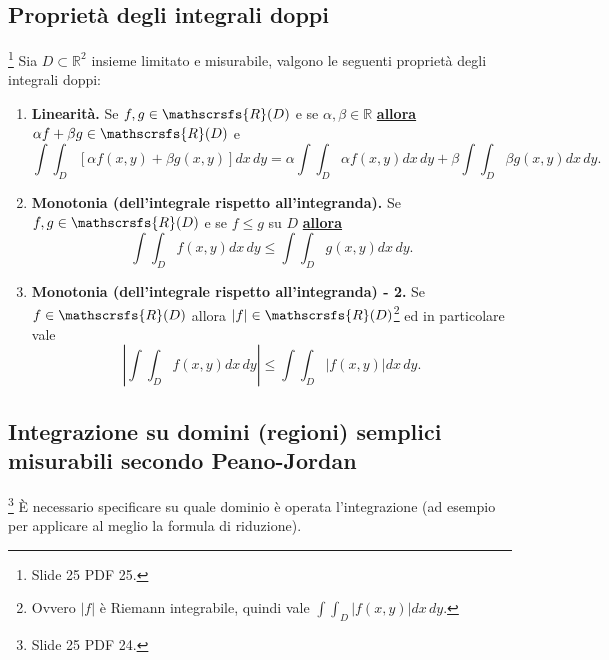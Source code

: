 \subsection{Proprietà degli integrali doppi}
\begin{property}\footnote{Slide 25 PDF 25.}
	 Sia $D\subset\mathbb{R}^2$ insieme limitato e misurabile, valgono le seguenti proprietà degli integrali doppi:
	\begin{enumerate}
		\item \textbf{Linearità.} Se $f,g\in\mathscrsfs{R}(D)$ e se $\alpha,\beta\in \mathbb{R}$ \textbf{\ul{allora}} $\alpha f + \beta g\in \mathscrsfs{R}(D)$ e
		\begin{equation*}
			\int\int_D [\alpha f(x,y) + \beta g(x,y)]dx\, dy = \alpha\int\int_D \alpha f(x,y) dx\, dy + \beta\int\int_D \beta g(x,y)dx\, dy.
		\end{equation*}
		\item \textbf{Monotonia (dell'integrale rispetto all'integranda).} Se $f,g\in\mathscrsfs{R}(D)$ e se $f\leq g$ su $D$ \textbf{\ul{allora}}
		\begin{equation*}
			\int\int_D f(x,y) dx\, dy \leq \int\int_D g(x,y) dx\, dy.
		\end{equation*}
		\item \textbf{Monotonia (dell'integrale rispetto all'integranda) - 2.} Se $f\in \mathscrsfs{R}(D)$ allora $|f|\in\mathscrsfs{R}(D)$\footnote{Ovvero $|f|$ è Riemann integrabile, quindi vale $\int\int_D |f(x,y)| dx\, dy$.} ed in particolare vale
		\begin{equation*}
			\left| \int\int_D f(x,y) dx\, dy\right| \leq \int\int_D |f(x,y)| dx\, dy.
		\end{equation*}
	\end{enumerate}
\end{property}

\subsection{Integrazione su domini (regioni) semplici misurabili secondo Peano-Jordan}
\footnote{Slide 25 PDF 24.} È necessario specificare su quale dominio è operata l'integrazione (ad esempio per applicare al meglio la formula di riduzione).

